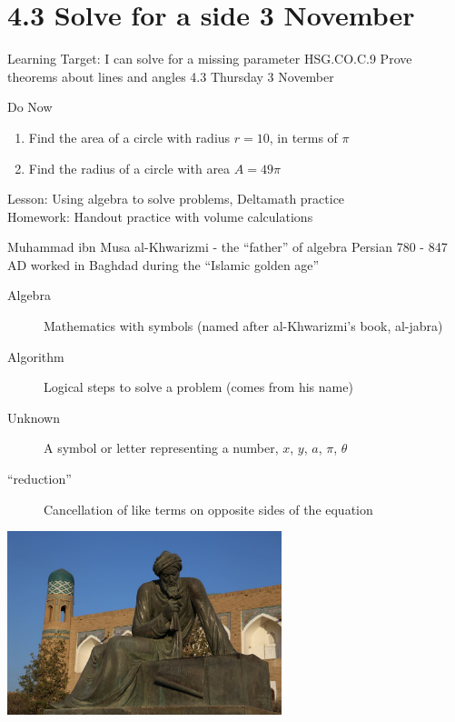 \documentclass[onlytextwidth, aspectratio=169]{beamer}
\begin{document}
\section{4.3 Solve for a side \hfill 3 November \,}
  \begin{frame}{Learning Target: I can solve for a missing parameter}
    {HSG.CO.C.9 Prove theorems about lines and angles  \hfill \alert{4.3 Thursday 3 November}}
    \begin{block}{Do Now}
      \begin{enumerate}
        \item Find the area of a circle with radius $r=10$, in terms of $\pi$
        \item Find the radius of a circle with area $A=49 \pi$
      \end{enumerate}
    \end{block}
      Lesson: Using algebra to solve problems, Deltamath practice \\
      Homework: Handout practice with volume calculations
  \end{frame}

\begin{frame}{Muhammad ibn Musa al-Khwarizmi - the ``father'' of algebra}
  {Persian 780 - 847 AD worked in Baghdad during the ``Islamic golden age''}
  \begin{description}
    \item[Algebra] Mathematics with symbols (named after al-Khwarizmi's book, al-jabra)
    \item[Algorithm] Logical steps to solve a problem (comes from his name)
    \item[Unknown] A symbol or letter representing a number, $x$, $y$, $a$, $\pi$, $\theta$
    \item[``reduction''] Cancellation of like terms on opposite sides of the equation
  \end{description}
    \center
    \includegraphics[width=0.6\textwidth]{../graphics/al-Khwarizmi_960-640.jpg}
\end{frame}
\end{document}
